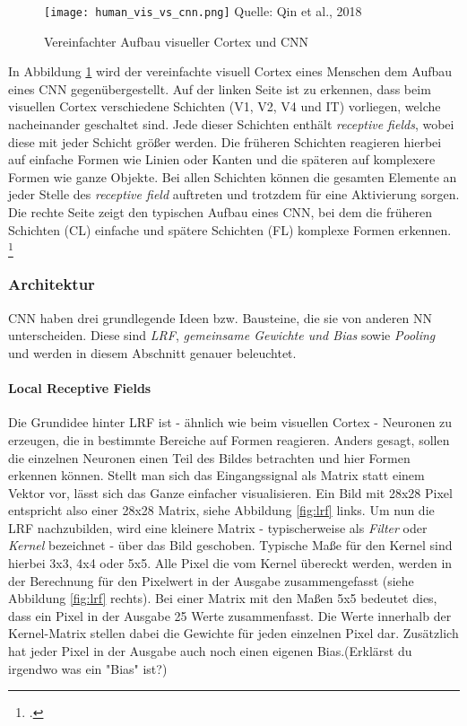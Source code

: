 
\begin{figure}[t]
    \centering
    \caption[]{Vereinfachter Aufbau visueller Cortex und \ac{CNN}}
	\label{fig:humVisVsCNN}
    \texttt{[image: human\_vis\_vs\_cnn.png]}
    Quelle: Qin et al., 2018
\end{figure}

In Abbildung \ref{fig:humVisVsCNN} wird der vereinfachte visuell Cortex eines Menschen dem Aufbau eines \ac{CNN} gegenübergestellt. Auf der linken Seite ist zu erkennen, dass beim visuellen Cortex verschiedene Schichten (V1, V2, V4 und IT) vorliegen, welche nacheinander geschaltet sind. Jede dieser Schichten enthält \textit{receptive fields}, wobei diese mit jeder Schicht größer werden. Die früheren Schichten reagieren hierbei auf einfache Formen wie Linien oder Kanten und die späteren auf komplexere Formen wie ganze Objekte. Bei allen Schichten können die gesamten Elemente an jeder Stelle des \textit{receptive field} auftreten und trotzdem für eine Aktivierung sorgen. Die rechte Seite zeigt den typischen Aufbau eines \ac{CNN}, bei dem die früheren Schichten (CL) einfache und spätere Schichten (FL) komplexe Formen erkennen. \footcite[Vgl. ][S. 6]{qinHowConvolutionalNeural2018}

\subsubsection{Architektur}
\ac{CNN} haben drei grundlegende Ideen bzw. Bausteine, die sie von anderen \ac{NN} unterscheiden. Diese sind \textit{\ac{LRF}}, \textit{gemeinsame Gewichte und Bias} sowie \textit{Pooling} und werden in diesem Abschnitt genauer beleuchtet.

\paragraph{Local Receptive Fields} \label{LocalReceptiveFields}
Die Grundidee hinter \ac{LRF} ist - ähnlich wie beim visuellen Cortex - Neuronen zu erzeugen, die in bestimmte Bereiche auf Formen reagieren. Anders gesagt, sollen die einzelnen Neuronen einen Teil des Bildes betrachten und hier Formen erkennen können. Stellt man sich das Eingangssignal als Matrix statt einem Vektor vor, lässt sich das Ganze einfacher visualisieren. Ein Bild mit 28x28 Pixel entspricht also einer 28x28 Matrix, siehe Abbildung \ref{fig:lrf} links. Um nun die \ac{LRF} nachzubilden, wird eine kleinere Matrix - typischerweise als \textit{Filter} oder \textit{Kernel} bezeichnet - über das Bild geschoben. Typische Maße für den Kernel sind hierbei 3x3, 4x4 oder 5x5. Alle Pixel die vom Kernel übereckt werden, werden in der Berechnung für den Pixelwert in der Ausgabe zusammengefasst (siehe Abbildung \ref{fig:lrf} rechts). Bei einer Matrix mit den Maßen 5x5 bedeutet dies, dass ein Pixel in der Ausgabe 25 Werte zusammenfasst. Die Werte innerhalb der Kernel-Matrix stellen dabei die Gewichte für jeden einzelnen Pixel dar. Zusätzlich hat jeder Pixel in der Ausgabe auch noch einen eigenen Bias.(Erklärst du irgendwo was ein "Bias" ist?)

